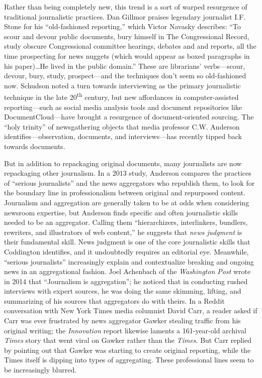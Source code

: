 Rather than being completely new, this trend is a sort of warped resurgence of traditional journalistic practices. Dan Gillmor praises legendary journalist I.F. Stone for his ``old-fashioned reporting,'' which Victor Navasky describes: ``To scour and devour public documents, bury himself in The Congressional Record, study obscure Congressional committee hearings, debates and and reports, all the time prospecting for news nuggets (which would appear as boxed paragraphs in his paper)\ldots He lived in the public domain.''\autocite[3-4]{gillmor_we_2006} These are librarians' verbs---scour, devour, bury, study, prospect---and the techniques don't seem so old-fashioned now. Schudson noted a turn towards interviewing as the primary journalistic technique in the late 20\textsuperscript{th} century, but new affordances in computer-assisted reporting---such as social media analysis tools and document repositories like DocumentCloud---have brought a resurgence of document-oriented sourcing. The ``holy trinity'' of newsgathering objects that media professor C.W. Anderson identifies---observation, documents, and interviews---has recently tipped back towards documents.\autocite[680]{coddington_defending_2014}

But in addition to repackaging original documents, many journalists are now repackaging other journalism. In a 2013 study, Anderson compares the practices of ``serious journalists'' and the news aggregators who republish them, to look for the boundary line in professionalism between original and repurposed content. Journalism and aggregation are generally taken to be at odds when considering newsroom expertise, but Anderson finds specific and often journalistic skills needed to be an aggregator. Calling them ``hierarchizers, interlinkers, bundlers, rewriters, and illustrators of web content,'' he suggests that \emph{news judgment} is their fundamental skill.\autocite{anderson_what_2013} News judgment is one of the core journalistic skills that Coddington identifies, and it undoubtedly requires an editorial eye. Meanwhile, ``serious journalists'' increasingly explain and contextualize breaking and ongoing news in an aggregational fashion. Joel Achenbach of the \emph{Washington Post} wrote in 2014 that ``Journalism is aggregation''; he noticed that in conducting rushed interviews with expert sources, he was doing the same skimming, lifting, and summarizing of his sources that aggregators do with theirs.\autocite{achenbach_journalism_2014} In a Reddit conversation with New York Times media columnist David Carr, a reader asked if Carr was ever frustrated by news aggregator Gawker stealing traffic from his original writing; the \emph{Innovation} report likewise laments a 161-year-old archival \emph{Times} story that went viral on Gawker rather than the \emph{Times}.\autocite[28]{_innovation_2014} But Carr replied by pointing out that Gawker was starting to create original reporting, while the Times itself is dipping into types of aggregating.\autocite{carr_iama_????} These professional lines seem to be increasingly blurred.

